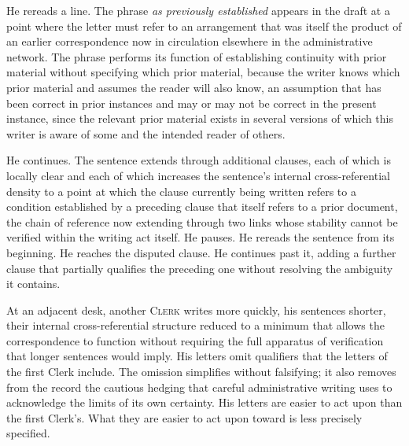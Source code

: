\documentclass[12pt, oneside]{article}
\newenvironment{action}{%
  \vspace{0.6em}%
  \noindent\ignorespaces%
}{%
  \par\vspace{0.6em}%
}
\begin{document}
\begin{action}
He rereads a line. The phrase \textit{as previously established} appears in the draft at a point where the letter must refer to an arrangement that was itself the product of an earlier correspondence now in circulation elsewhere in the administrative network. The phrase performs its function of establishing continuity with prior material without specifying which prior material, because the writer knows which prior material and assumes the reader will also know, an assumption that has been correct in prior instances and may or may not be correct in the present instance, since the relevant prior material exists in several versions of which this writer is aware of some and the intended reader of others.

He continues. The sentence extends through additional clauses, each of which is locally clear and each of which increases the sentence's internal cross-referential density to a point at which the clause currently being written refers to a condition established by a preceding clause that itself refers to a prior document, the chain of reference now extending through two links whose stability cannot be verified within the writing act itself. He pauses. He rereads the sentence from its beginning. He reaches the disputed clause. He continues past it, adding a further clause that partially qualifies the preceding one without resolving the ambiguity it contains.

At an adjacent desk, another \textsc{Clerk} writes more quickly, his sentences shorter, their internal cross-referential structure reduced to a minimum that allows the correspondence to function without requiring the full apparatus of verification that longer sentences would imply. His letters omit qualifiers that the letters of the first Clerk include. The omission simplifies without falsifying; it also removes from the record the cautious hedging that careful administrative writing uses to acknowledge the limits of its own certainty. His letters are easier to act upon than the first Clerk's. What they are easier to act upon toward is less precisely specified.
\end{action}
\end{document}

